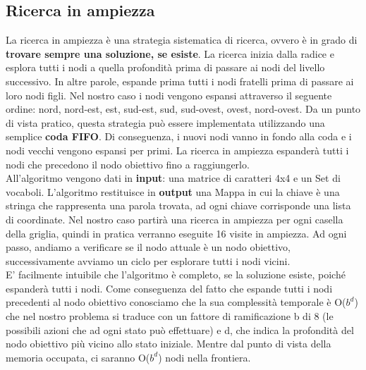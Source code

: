 \documentclass[10pt,a4paper]{article}
\begin{document}
	\subsection{Ricerca in ampiezza}
	La ricerca in ampiezza è una strategia sistematica di ricerca, ovvero è in grado di \textbf{trovare	sempre una soluzione, se esiste}. La ricerca inizia dalla radice e esplora tutti i nodi a quella profondità prima di passare ai nodi del livello successivo. In altre parole, espande prima tutti i nodi fratelli prima di passare ai loro nodi figli. Nel nostro caso i nodi vengono espansi attraverso il seguente ordine: nord, nord-est, est, sud-est, sud, sud-ovest, ovest, nord-ovest.
	Da un punto di vista pratico, questa strategia può essere implementata utilizzando una semplice \textbf{coda FIFO}. Di conseguenza, i nuovi nodi vanno in fondo alla coda e i nodi vecchi vengono espansi per primi. La ricerca in ampiezza espanderà tutti i nodi che precedono il nodo obiettivo fino a raggiungerlo.\\
	All'algoritmo vengono dati in \textbf{input}: una matrice di caratteri 4x4 e un Set di vocaboli. L'algoritmo restituisce in \textbf{output} una Mappa in cui la chiave è una stringa che rappresenta una parola trovata, ad ogni chiave corrisponde una lista di coordinate.
	Nel nostro caso partirà una ricerca in ampiezza per ogni casella della griglia, quindi in pratica verranno eseguite 16 visite in ampiezza.
	Ad ogni passo, andiamo a verificare se il nodo attuale è un nodo obiettivo, successivamente avviamo un ciclo per esplorare tutti i nodi vicini.\\
	E’ facilmente intuibile che l’algoritmo è completo, se la soluzione esiste, poiché espanderà tutti i nodi.
	Come conseguenza del fatto che espande tutti i nodi precedenti al nodo obiettivo conosciamo che la sua complessità temporale è O($b^d$) che nel nostro problema si traduce con un fattore di ramificazione b di 8 (le possibili azioni che ad ogni stato può effettuare) e d, che indica la profondità del nodo obiettivo più vicino allo stato iniziale. Mentre dal punto di vista della memoria occupata, ci saranno O($b^d$) nodi nella frontiera.
\end{document}
